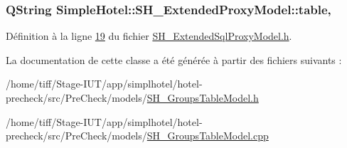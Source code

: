 \hypertarget{classSimpleHotel_1_1SH__ExtendedProxyModel_a98cd3050230163561b4dac11a9675b8e}{
\subsubsection[{table}]{\setlength{\rightskip}{0pt plus 5cm}Q\-String Simple\-Hotel\-::\-S\-H\-\_\-\-Extended\-Proxy\-Model\-::table\hspace{0.3cm}{\ttfamily [read]}, {\ttfamily [inherited]}}}\label{classSimpleHotel_1_1SH__ExtendedProxyModel_a98cd3050230163561b4dac11a9675b8e}


Définition à la ligne \hyperlink{SH__ExtendedSqlProxyModel_8h_source_l00019}{19} du fichier \hyperlink{SH__ExtendedSqlProxyModel_8h_source}{S\-H\-\_\-\-Extended\-Sql\-Proxy\-Model.\-h}.



La documentation de cette classe a été générée à partir des fichiers suivants \-:\begin{DoxyCompactItemize}
\item 
/home/tiff/\-Stage-\/\-I\-U\-T/app/simplhotel/hotel-\/precheck/src/\-Pre\-Check/models/\hyperlink{SH__GroupsTableModel_8h}{S\-H\-\_\-\-Groups\-Table\-Model.\-h}\item 
/home/tiff/\-Stage-\/\-I\-U\-T/app/simplhotel/hotel-\/precheck/src/\-Pre\-Check/models/\hyperlink{SH__GroupsTableModel_8cpp}{S\-H\-\_\-\-Groups\-Table\-Model.\-cpp}\end{DoxyCompactItemize}
